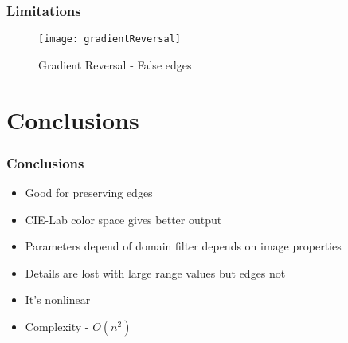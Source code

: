 \documentclass{beamer}
\begin{document}
\begin{frame}
\frametitle{Limitations}
\begin{figure}
\texttt{[image: gradientReversal]}
\caption{Gradient Reversal - False edges}
\end{figure}
\end{frame}

\section{Conclusions}


\begin{frame}
\frametitle{Conclusions}
\begin{itemize}
	\item Good for preserving edges
	\item CIE-Lab color space gives better output
	\item Parameters depend of domain filter depends on image properties
	\item Details are lost with large range values but edges not
	\item It's nonlinear
	\item Complexity - $O(n^{2})$
\end{itemize}
\end{frame}





















%
%
\end{document}
